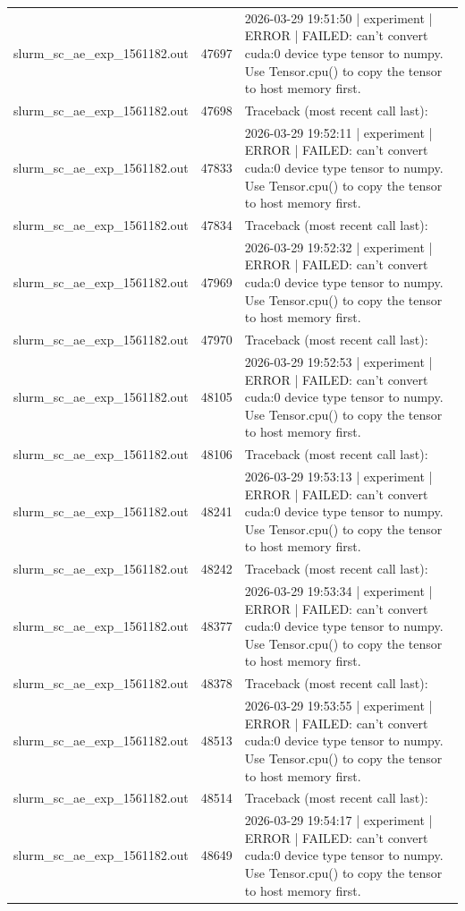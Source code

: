 \begin{tabular}{lrl}
slurm\_sc\_ae\_exp\_1561182.out & 47697 & 2026-03-29 19:51:50 | experiment | ERROR |   FAILED: can't convert cuda:0 device type tensor to numpy. Use Tensor.cpu() to copy the tensor to host memory first. \\
slurm\_sc\_ae\_exp\_1561182.out & 47698 & Traceback (most recent call last): \\
slurm\_sc\_ae\_exp\_1561182.out & 47833 & 2026-03-29 19:52:11 | experiment | ERROR |   FAILED: can't convert cuda:0 device type tensor to numpy. Use Tensor.cpu() to copy the tensor to host memory first. \\
slurm\_sc\_ae\_exp\_1561182.out & 47834 & Traceback (most recent call last): \\
slurm\_sc\_ae\_exp\_1561182.out & 47969 & 2026-03-29 19:52:32 | experiment | ERROR |   FAILED: can't convert cuda:0 device type tensor to numpy. Use Tensor.cpu() to copy the tensor to host memory first. \\
slurm\_sc\_ae\_exp\_1561182.out & 47970 & Traceback (most recent call last): \\
slurm\_sc\_ae\_exp\_1561182.out & 48105 & 2026-03-29 19:52:53 | experiment | ERROR |   FAILED: can't convert cuda:0 device type tensor to numpy. Use Tensor.cpu() to copy the tensor to host memory first. \\
slurm\_sc\_ae\_exp\_1561182.out & 48106 & Traceback (most recent call last): \\
slurm\_sc\_ae\_exp\_1561182.out & 48241 & 2026-03-29 19:53:13 | experiment | ERROR |   FAILED: can't convert cuda:0 device type tensor to numpy. Use Tensor.cpu() to copy the tensor to host memory first. \\
slurm\_sc\_ae\_exp\_1561182.out & 48242 & Traceback (most recent call last): \\
slurm\_sc\_ae\_exp\_1561182.out & 48377 & 2026-03-29 19:53:34 | experiment | ERROR |   FAILED: can't convert cuda:0 device type tensor to numpy. Use Tensor.cpu() to copy the tensor to host memory first. \\
slurm\_sc\_ae\_exp\_1561182.out & 48378 & Traceback (most recent call last): \\
slurm\_sc\_ae\_exp\_1561182.out & 48513 & 2026-03-29 19:53:55 | experiment | ERROR |   FAILED: can't convert cuda:0 device type tensor to numpy. Use Tensor.cpu() to copy the tensor to host memory first. \\
slurm\_sc\_ae\_exp\_1561182.out & 48514 & Traceback (most recent call last): \\
slurm\_sc\_ae\_exp\_1561182.out & 48649 & 2026-03-29 19:54:17 | experiment | ERROR |   FAILED: can't convert cuda:0 device type tensor to numpy. Use Tensor.cpu() to copy the tensor to host memory first. \\

\end{tabular}
